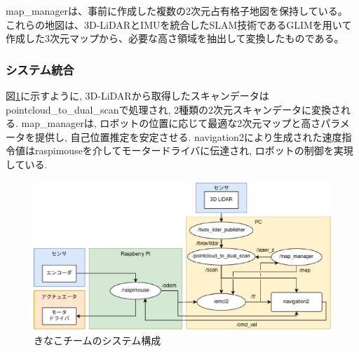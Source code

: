 map\_managerは、事前に作成した複数の2次元占有格子地図を保持している。
これらの地図は、3D-LiDARとIMUを統合したSLAM技術であるGLIMを用いて作成した3次元マップから、必要な高さ領域を抽出して変換したものである。

\subsubsection{システム統合}
図\ref{fig:kinako_system}に示すように, 3D-LiDARから取得したスキャンデータはpointcloud\_to\_dual\_scanで処理され, 2種類の2次元スキャンデータに変換される. 
map\_managerは, ロボットの位置に応じて最適な2次元マップと高さパラメータを提供し, 自己位置推定を安定させる. 
navigation2により生成された速度指令値はraspimouseを介してモータードライバに伝達され, ロボットの制御を実現している. 

\begin{figure}[h]
  \begin{center}
    \includegraphics[width=1.0\linewidth]{figs/kinako_system.eps}
    \caption{きなこチームのシステム構成}
    \label{fig:kinako_system}
  \end{center}
\end{figure}
